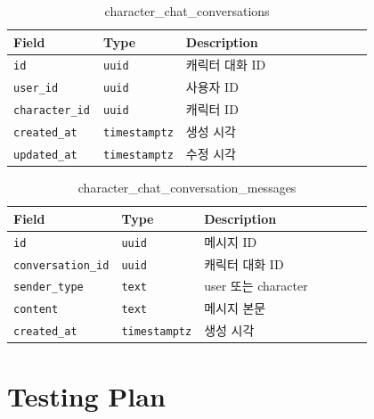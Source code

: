 \documentclass[11pt,a4paper]{article}
\renewcommand{\arraystretch}{1.18}
\begin{document}
\begin{table}[H]
\centering
\footnotesize
\setlength{\tabcolsep}{5pt}
\renewcommand{\arraystretch}{1.28}
\begin{tabularx}{\linewidth}{@{}>{\RaggedRight\arraybackslash}p{0.25\linewidth}>{\RaggedRight\arraybackslash}p{0.22\linewidth}>{\RaggedRight\arraybackslash}X@{}}
\toprule
\textbf{Field} & \textbf{Type} & \textbf{Description} \\
\midrule
\texttt{id} & \texttt{uuid} & 캐릭터 대화 ID \\
\texttt{user\_\allowbreak{}id} & \texttt{uuid} & 사용자 ID \\
\texttt{character\_\allowbreak{}id} & \texttt{uuid} & 캐릭터 ID \\
\texttt{created\_\allowbreak{}at} & \texttt{timestamptz} & 생성 시각 \\
\texttt{updated\_\allowbreak{}at} & \texttt{timestamptz} & 수정 시각 \\
\bottomrule
\end{tabularx}
\caption{character\_chat\_conversations}
\end{table}

\begin{table}[H]
\centering
\footnotesize
\setlength{\tabcolsep}{5pt}
\renewcommand{\arraystretch}{1.28}
\begin{tabularx}{\linewidth}{@{}>{\RaggedRight\arraybackslash}p{0.25\linewidth}>{\RaggedRight\arraybackslash}p{0.22\linewidth}>{\RaggedRight\arraybackslash}X@{}}
\toprule
\textbf{Field} & \textbf{Type} & \textbf{Description} \\
\midrule
\texttt{id} & \texttt{uuid} & 메시지 ID \\
\texttt{conversation\_\allowbreak{}id} & \texttt{uuid} & 캐릭터 대화 ID \\
\texttt{sender\_\allowbreak{}type} & \texttt{text} & user 또는 character \\
\texttt{content} & \texttt{text} & 메시지 본문 \\
\texttt{created\_\allowbreak{}at} & \texttt{timestamptz} & 생성 시각 \\
\bottomrule
\end{tabularx}
\caption{character\_chat\_conversation\_messages}
\end{table}

\clearpage

\hypertarget{testing-plan}{%
\section{Testing Plan}\label{testing-plan}}
\end{document}
